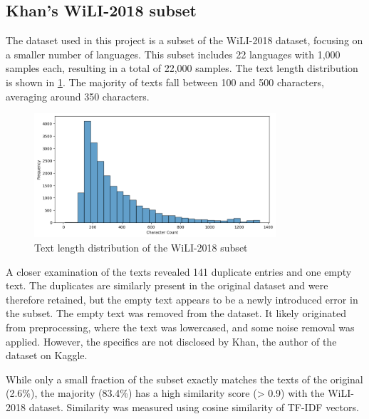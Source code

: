 \subsection{Khan's WiLI-2018 subset}\label{subsec:wili2018}
The dataset used in this project is a subset of the WiLI-2018 dataset, focusing on a smaller number of languages. This subset includes 22 languages with 1,000 samples each, resulting in a total of 22,000 samples. The text length distribution is shown in \cref{fig:text_length_distribution}. The majority of texts fall between 100 and 500 characters, averaging around 350 characters.

\begin{figure}
    \centering
    \includegraphics[width=0.8\textwidth]{figures/text_lengths.png}
    \caption{Text length distribution of the WiLI-2018 subset}
    \label{fig:text_length_distribution}
\end{figure}

A closer examination of the texts revealed 141 duplicate entries and one empty text. The duplicates are similarly present in the original dataset and were therefore retained, but the empty text appears to be a newly introduced error in the subset. The empty text was removed from the dataset. It likely originated from preprocessing, where the text was lowercased, and some noise removal was applied. However, the specifics are not disclosed by Khan, the author of the dataset on Kaggle. \cite{Khan2018}

While only a small fraction of the subset exactly matches the texts of the original (2.6\%), the majority (83.4\%) has a high similarity score (> 0.9) with the WiLI-2018 dataset. Similarity was measured using cosine similarity of TF-IDF vectors. 
